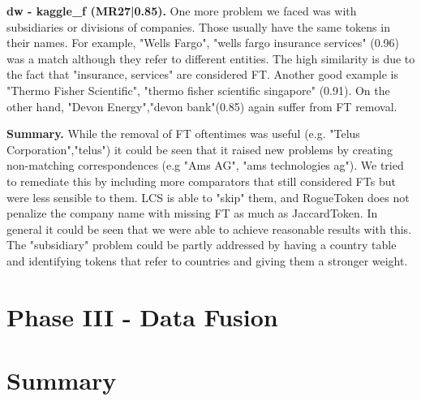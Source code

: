 \documentclass[11pt,titlepage,oneside,openany]{article}
\begin{document}
\textbf{dw - kaggle\_f (MR27|0.85). } One more problem we faced was with subsidiaries or divisions of companies. Those usually have the same tokens in their names. For example, "Wells Fargo", "wells fargo insurance services" (0.96) was a match although they refer to different entities. The high similarity is due to the fact that "insurance, services" are considered FT. Another good example is "Thermo Fisher Scientific", "thermo fisher scientific singapore" (0.91). On the other hand, "Devon Energy","devon bank"(0.85) again suffer from FT removal.

\textbf{Summary. }While the removal of FT oftentimes was useful (e.g. "Telus Corporation","telus") it could be seen that it raised new problems by creating non-matching correspondences (e.g "Ams AG", "ams technologies ag"). We tried to remediate this by including more comparators that still considered FTs but were less sensible to them. LCS is able to "skip" them, and RogueToken does not penalize the company name with missing FT as much as JaccardToken. In general it could be seen that we were able to achieve reasonable results with this. The "subsidiary" problem could be partly addressed by having a country table and identifying tokens that refer to countries and giving them a stronger weight.



\section{Phase III - Data Fusion}
\label{cha:data-fusion}



\section{Summary}
\end{document}
